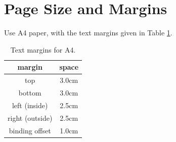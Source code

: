 \documentclass{cslthse-msc}
\begin{document}
\section{Page Size and Margins}
Use A4 paper, with the text margins given in Table \ref{tab:margins}.
\begin{table}[!hbt]
\centering
\caption{Text margins for A4.}\label{tab:margins}
\begin{tabular}{cc}
\hline
\textbf{margin} & \textbf{space} \\
\hline 
top &  3.0cm\\ 

bottom & 3.0cm \\ 
 
left (inside) & 2.5cm \\ 

right (outside) & 2.5cm \\ 

binding offset & 1.0cm \\ 
\hline 
\end{tabular} 
\end{table}
\end{document}
